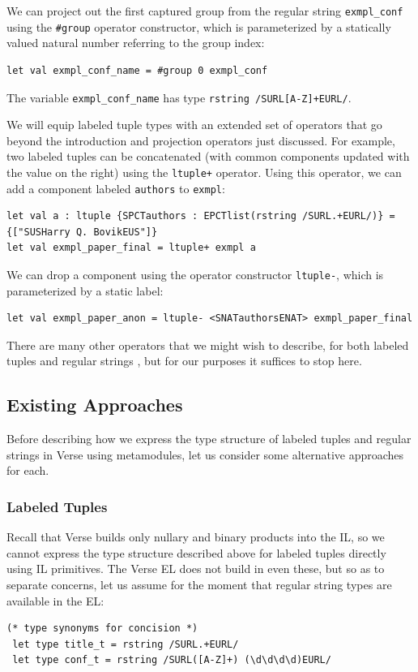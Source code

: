 We can project out the first captured group from the regular string \lstinline{exmpl_conf} using the \lstinline{#group} operator constructor, which is parameterized by a statically valued natural number referring to the group index:
\begin{lstlisting}[numbers=none]
let val exmpl_conf_name = #group 0 exmpl_conf
\end{lstlisting}
The variable \lstinline{exmpl_conf_name} has type \lstinline{rstring /SURL[A-Z]+EURL/}.

We will equip labeled tuple types with an extended set of operators that go beyond the introduction and projection operators just discussed. For example, two labeled tuples can be concatenated (with common components updated with the value on the right) using the \lstinline{ltuple+} operator. Using this operator, we can add a component labeled \lstinline{authors} to \lstinline{exmpl}:
\begin{lstlisting}[numbers=none]
let val a : ltuple {SPCTauthors : EPCTlist(rstring /SURL.+EURL/)} = {["SUSHarry Q. BovikEUS"]}
let val exmpl_paper_final = ltuple+ exmpl a
\end{lstlisting}
We can drop a component using the operator constructor \lstinline{ltuple-}, which is parameterized by a static label:
\begin{lstlisting}[numbers=none]
let val exmpl_paper_anon = ltuple- <SNATauthorsENAT> exmpl_paper_final
\end{lstlisting}
There are many other operators that we might wish to describe, for both labeled tuples \cite{Cardelli91operationson} and regular strings \cite{sanitation-psp14}, but for our purposes it suffices to stop here.

\subsection{Existing Approaches}\label{sec:metamodules-related}
Before describing how we express the type structure of labeled tuples and regular strings in Verse using metamodules, let us consider some alternative approaches for each.

\subsubsection{Labeled Tuples}
Recall that Verse builds only nullary and binary products into the IL, so we cannot express the type structure described above for labeled tuples  directly using IL primitives. The Verse EL does not build in even these, but so as to separate concerns, let us assume for the moment that regular string types are available in the EL: %
\begin{lstlisting}[numbers=none]
 (* type synonyms for concision *)
 let type title_t = rstring /SURL.+EURL/
 let type conf_t = rstring /SURL([A-Z]+) (\d\d\d\d)EURL/
\end{lstlisting}

